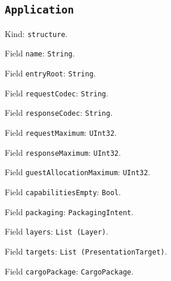 \documentclass[11pt]{article}
\begin{document}
\subsection*{\texttt{Application}}
\noindent Kind: \texttt{structure}.\par
\noindent Field \texttt{name}: \texttt{String}.\par
\noindent Field \texttt{entryRoot}: \texttt{String}.\par
\noindent Field \texttt{requestCodec}: \texttt{String}.\par
\noindent Field \texttt{responseCodec}: \texttt{String}.\par
\noindent Field \texttt{requestMaximum}: \texttt{UInt32}.\par
\noindent Field \texttt{responseMaximum}: \texttt{UInt32}.\par
\noindent Field \texttt{guestAllocationMaximum}: \texttt{UInt32}.\par
\noindent Field \texttt{capabilitiesEmpty}: \texttt{Bool}.\par
\noindent Field \texttt{packaging}: \texttt{PackagingIntent}.\par
\noindent Field \texttt{layers}: \texttt{List (Layer)}.\par
\noindent Field \texttt{targets}: \texttt{List (PresentationTarget)}.\par
\noindent Field \texttt{cargoPackage}: \texttt{CargoPackage}.\par
\end{document}
